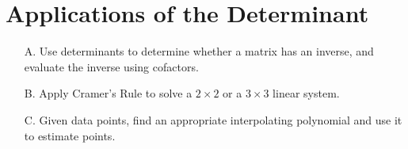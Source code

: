 \section{Applications of the Determinant}

\begin{outcome}
\begin{enumerate}
\item[A.] Use determinants to determine whether a matrix has an inverse, and evaluate the inverse using cofactors. 

\item[B.] Apply Cramer's Rule to solve a $2\times 2$ or a $3\times 3$ linear
system.

\item[C.] Given data points, find an appropriate interpolating polynomial and use it to estimate points. 

\end{enumerate}
\end{outcome}
